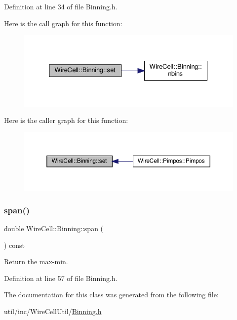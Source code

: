 Definition at line 34 of file Binning.\+h.

Here is the call graph for this function\+:
\nopagebreak
\begin{figure}[H]
\begin{center}
\leavevmode
\includegraphics[width=326pt]{class_wire_cell_1_1_binning_a6bbcf5f258e115803cbd83cb25f839d4_cgraph}
\end{center}
\end{figure}
Here is the caller graph for this function\+:
\nopagebreak
\begin{figure}[H]
\begin{center}
\leavevmode
\includegraphics[width=350pt]{class_wire_cell_1_1_binning_a6bbcf5f258e115803cbd83cb25f839d4_icgraph}
\end{center}
\end{figure}
\mbox{\label{class_wire_cell_1_1_binning_ad89e1175b26214dc7fda52ee7e47db3e}} 
\subsubsection{\texorpdfstring{span()}{span()}}
{\footnotesize\ttfamily double Wire\+Cell\+::\+Binning\+::span (\begin{DoxyParamCaption}{ }\end{DoxyParamCaption}) const\hspace{0.3cm}{\ttfamily [inline]}}



Return the max-\/min. 



Definition at line 57 of file Binning.\+h.



The documentation for this class was generated from the following file\+:\begin{DoxyCompactItemize}
\item 
util/inc/\+Wire\+Cell\+Util/\hyperlink{_binning_8h}{Binning.\+h}\end{DoxyCompactItemize}
